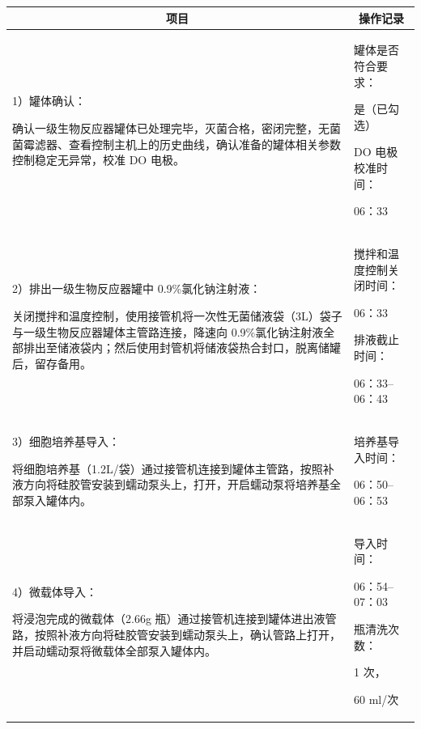 \documentclass[UTF8,10pt,a4paper,fontset=fandol]{ctexart}
\newcommand{\fieldvalue}[1]{#1}
\newcommand{\handwritten}[1]{#1}
\begin{document}
\begin{tabularx}{\textwidth}{|p{}|X|}
\hline
\multicolumn{1}{|c|}{项目} & \multicolumn{1}{c|}{操作记录}\\
\hline
1）罐体确认：

确认一级生物反应器罐体已处理完毕，灭菌合格，密闭完整，无菌菌霉滤器、查看控制主机上的历史曲线，确认准备的罐体相关参数控制稳定无异常，校准 DO 电极。 &
罐体是否符合要求：

\fieldvalue{是（已勾选）}

DO 电极校准时间：

\fieldvalue{\handwritten{06：33}}\\
\hline
2）排出一级生物反应器罐中 0.9\%氯化钠注射液：

关闭搅拌和温度控制，使用接管机将一次性无菌储液袋（3L）袋子与一级生物反应器罐体主管路连接，降速向 0.9\%氯化钠注射液全部排出至储液袋内；然后使用封管机将储液袋热合封口，脱离储罐后，留存备用。 &
搅拌和温度控制关闭时间：

\fieldvalue{\handwritten{06：33}}

排液截止时间：

\fieldvalue{\handwritten{06：33--06：43}}\\
\hline
3）细胞培养基导入：

将细胞培养基（1.2L/袋）通过接管机连接到罐体主管路，按照补液方向将硅胶管安装到蠕动泵头上，打开，开启蠕动泵将培养基全部泵入罐体内。 &
培养基导入时间：

\fieldvalue{\handwritten{06：50--06：53}}\\
\hline
4）微载体导入：

将浸泡完成的微载体（2.66g 瓶）通过接管机连接到罐体进出液管路，按照补液方向将硅胶管安装到蠕动泵头上，确认管路上打开，并启动蠕动泵将微载体全部泵入罐体内。 &
导入时间：

\fieldvalue{\handwritten{06：54--07：03}}

瓶清洗次数：

\fieldvalue{\handwritten{1}} 次，

\fieldvalue{\handwritten{60 ml/次}}\\
\hline
\end{tabularx}
\end{document}
